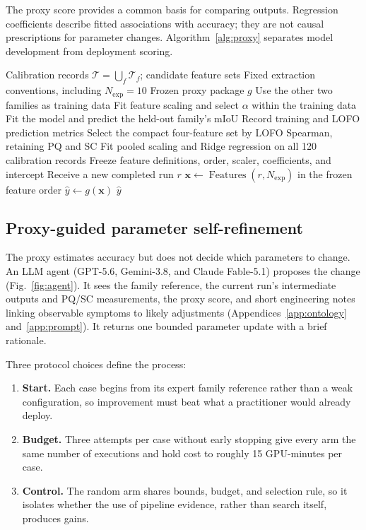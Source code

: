 \documentclass[a4paper,fleqn]{cas-dc}
\begin{document}
{The proxy score provides a common basis for comparing outputs. Regression coefficients describe fitted associations with accuracy; they are not causal prescriptions for parameter changes. Algorithm~\ref{alg:proxy} separates model development from deployment scoring.

\begin{algorithm}[ht]
\caption{Proxy calibration and deployment scoring}
\label{alg:proxy}
\begin{algorithmic}[1]
\Require Calibration records $\mathcal{T}=\bigcup_f\mathcal{T}_f$; candidate feature sets
\Require Fixed extraction conventions, including $N_{\mathrm{exp}}=10$
\Ensure Frozen proxy package $g$
        \State Use the other two families as training data
        \State Fit feature scaling and select $\alpha$ within the training data
        \State Fit the model and predict the held-out family's mIoU
    \EndFor
    \State Record training and LOFO prediction metrics
\EndFor
\State Select the compact four-feature set by LOFO Spearman, retaining PQ and SC
\State Fit pooled scaling and Ridge regression on all 120 calibration records
\State Freeze feature definitions, order, scaler, coefficients, and intercept
\Statex
\State Receive a new completed run $r$
\State $\mathbf{x}\gets\operatorname{Features}(r,N_{\mathrm{exp}})$ in the frozen feature order
\State $\hat{y}\gets g(\mathbf{x})$
\State \Return $\hat{y}$
\end{algorithmic}
\end{algorithm}


\subsection{Proxy-guided parameter self-refinement}
\label{sec:agent-design}

The proxy estimates accuracy but does not decide which parameters to change. An LLM agent (GPT-5.6, Gemini-3.8, and Claude Fable-5.1) proposes the change (Fig.~\ref{fig:agent}). It sees the family reference, the current run's intermediate outputs and PQ/SC measurements, the proxy score, and short engineering notes linking observable symptoms to likely adjustments (Appendices~\ref{app:ontology} and~\ref{app:prompt}). It returns one bounded parameter update with a brief rationale.

Three protocol choices define the process:
\begin{enumerate}
\renewcommand{\labelenumi}{\roman{enumi}.}
\item \textbf{Start.} Each case begins from its expert family reference rather than a weak configuration, so improvement must beat what a practitioner would already deploy.
\item \textbf{Budget.} Three attempts per case without early stopping give every arm the same number of executions and hold cost to roughly 15 GPU-minutes per case.
\item \textbf{Control.} The random arm shares bounds, budget, and selection rule, so it isolates whether the use of pipeline evidence, rather than search itself, produces gains.
\end{enumerate}

}
\end{document}
